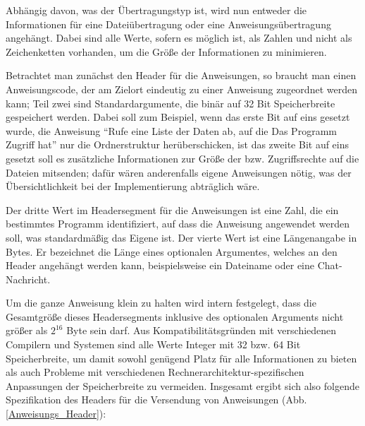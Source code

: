 Abhängig davon, was der Übertragungstyp ist, wird nun entweder die Informationen für eine Dateiübertragung oder eine Anweisungsübertragung angehängt.
Dabei sind alle Werte, sofern es möglich ist, als Zahlen und nicht als Zeichenketten vorhanden, um die Größe der Informationen zu minimieren.\\\par
Betrachtet man zunächst den Header für die Anweisungen, so braucht man einen Anweisungscode, der am Zielort eindeutig zu einer Anweisung zugeordnet werden kann; Teil zwei sind Standardargumente, die binär auf 32 Bit Speicherbreite gespeichert werden.
Dabei soll zum Beispiel, wenn das erste Bit auf eins gesetzt wurde, die Anweisung "`Rufe eine Liste der Daten ab, auf die Das Programm Zugriff hat"' nur die Ordnerstruktur herüberschicken, ist das zweite Bit auf eins gesetzt soll es zusätzliche Informationen zur Größe der bzw. Zugriffsrechte auf die Dateien mitsenden; dafür wären anderenfalls eigene Anweisungen nötig, was der Übersichtlichkeit bei der Implementierung abträglich wäre.\par 
Der dritte Wert im Headersegment für die Anweisungen ist eine Zahl, die ein bestimmtes Programm identifiziert, auf dass die Anweisung angewendet werden soll, was standardmäßig das Eigene ist.
Der vierte Wert ist eine Längenangabe in Bytes.
Er bezeichnet die Länge eines optionalen Argumentes, welches an den Header angehängt werden kann, beispielsweise ein Dateiname oder eine Chat-Nachricht.\par 
Um die ganze Anweisung klein zu halten wird intern festgelegt, dass die Gesamtgröße dieses Headersegments inklusive des optionalen Arguments nicht größer als $2^{16}$ Byte sein darf.
Aus Kompatibilitätsgründen mit verschiedenen Compilern und Systemen sind alle Werte Integer mit 32 bzw. 64 Bit Speicherbreite, um damit sowohl genügend Platz für alle Informationen zu bieten als auch Probleme mit verschiedenen Rechnerarchitektur-spezifischen Anpassungen der Speicherbreite zu vermeiden.
Insgesamt ergibt sich also folgende Spezifikation des Headers für die Versendung von Anweisungen (Abb. \ref{Anweisungs_Header}):\par


